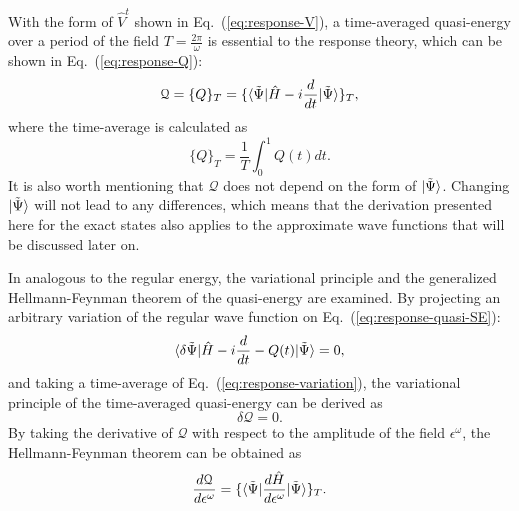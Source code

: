 With the form of $\hat{V}^{t}$ shown in Eq.~(\ref{eq:response-V}), a time-averaged quasi-energy\cite{Christiansen1998} over a period of the field $T=\frac{2\pi}{\omega}$ is essential to the response theory, which can be shown in Eq.~(\ref{eq:response-Q}):
\begin{equation}
\mathcal{Q} = \{Q\}_{T} = \{\langle\tilde{\Psi} |\hat{H}-i\frac{d}{dt}| \tilde{\Psi} \rangle\}_{T},
\label{eq:response-Q}
\end{equation}
where the time-average is calculated as
\begin{equation}
\{Q\}_{T} = \frac{1}{T}\int_{0}^{1}Q(t)dt.
\end{equation}
It is also worth mentioning that $\mathcal{Q}$ does not depend on the form of $| \tilde{\Psi} \rangle$. Changing $| \tilde{\Psi} \rangle$ will not lead to any differences, which means that the derivation presented here for the exact states also applies to the approximate wave functions that will be discussed later on.

In analogous to the regular energy, the variational principle\cite{Ekeland1974} and the generalized Hellmann-Feynman theorem\cite{Hayes1965} of the quasi-energy are examined. By projecting an arbitrary variation of the regular wave function on Eq.~(\ref{eq:response-quasi-SE}): 
\begin{equation}
\langle\delta\tilde{\Psi} | \hat{H} - i\frac{d}{dt} - Q(t) | \tilde{\Psi} \rangle = 0, 
\label{eq:response-variation}
\end{equation}
and taking a time-average of Eq.~(\ref{eq:response-variation}), the variational principle of the time-averaged quasi-energy can be derived as 
\begin{equation}
\delta\mathcal{Q} = 0.
\end{equation}
By taking the derivative of $\mathcal{Q}$ with respect to the amplitude of the field $\epsilon^{\omega}$, the Hellmann-Feynman theorem can be obtained as
\begin{equation}
\frac{d\mathcal{	Q}}{d\epsilon^{\omega}}=\{\langle\tilde{\Psi} |\frac{d\hat{H}}{d\epsilon^{\omega}}| \tilde{\Psi} \rangle\}_{T}.
\end{equation}

